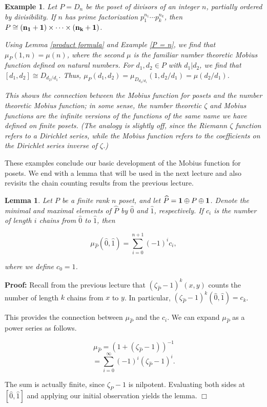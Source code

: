 \documentclass[11pt]{article}
\newtheorem{lemma}[theorem]{Lemma}
\newtheorem{example}[theorem]{Example}
\newenvironment{proof}{\noindent \textbf{Proof:}}{$\Box$}
\begin{document}
\begin{example}
Let $P = D_n$ be the poset of divisors of an integer $n$, partially
ordered by divisibility. If $n$ has prime factorization $p_1^{n_1}
\cdots p_k^{n_k}$, then $P \cong ({\bf n_1 + 1}) \times \cdots \times
({\bf n_k + 1})$. 

Using Lemma \ref{product formula} and Example \ref{P = n}, we find
that $\mu_P(1, n) = \mu(n)$, where the second $\mu$ is the familiar
number theoretic Mobius function defined on natural numbers. For $d_1,
d_2 \in P$ with $d_1 | d_2$, we find that $[d_1, d_2] \cong
D_{d_2/d_1}$. Thus, $\mu_P(d_1, d_2) = \mu_{D_{d_2/d_1}}(1, d_2/d_1) =
\mu(d_2/d_1)$.

This shows the connection between the Mobius function for posets and
the number theoretic Mobius function; in some sense, the number
theoretic $\zeta$ and Mobius functions are the infinite versions of
the functions of the same name we have defined on finite posets. (The
analogy is slightly off, since the Riemann $\zeta$ function refers to
a Dirichlet series, while the Mobius function refers to the
coefficients on the Dirichlet series inverse of $\zeta$.)
\end{example}

These examples conclude our basic development of the Mobius function
for posets. We end with a lemma that will be used in the next lecture
and also revisits the chain counting results from the previous
lecture.

\begin{lemma}
Let $P$ be a finite rank $n$ poset, and let $\widehat{P} = {\bf 1}
\oplus P \oplus {\bf 1}$. Denote the minimal and maximal elements of
$\widehat{P}$ by $\widehat{0}$ and $\widehat{1}$, respectively. If
$c_i$ is the number of length $i$ chains from $\widehat{0}$ to
$\widehat{1}$, then

\[ \mu_{\widehat{P}} (\widehat{0}, \widehat{1}) = \sum_{i = 0}^{n + 1} (-1)^i c_i, \]

where we define $c_0 = 1$.
\end{lemma}
\begin{proof}
Recall from the previous lecture that $(\zeta_{\widehat{P}} - 1)^k(x,
y)$ counts the number of length $k$ chains from $x$ to $y$. In
particular, $(\zeta_{\widehat{P}} - 1)^k(\widehat{0}, \widehat{1}) =
c_k$.

This provides the connection between $\mu_{\widehat{P}}$ and the
$c_i$. We can expand $\mu_{\widehat{P}}$ as a power series as follows.

\[ \mu_{\widehat{P}} = \left( 1 + (\zeta_{\widehat{P}} - 1) \right)^{-1} \]
\[ = \sum_{i = 0}^\infty (-1)^i (\zeta_{\widehat{P}} - 1)^i. \]

The sum is actually finite, since $\zeta_{\widehat{P}} - 1$ is
nilpotent. Evaluating both sides at $[\widehat{0}, \widehat{1}]$ and
applying our initial observation yields the lemma.
\end{proof}
\end{document}
